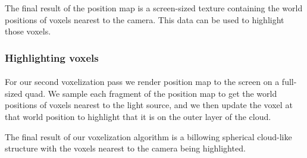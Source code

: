 The final result of the position map is a screen-sized texture containing the world positions of voxels nearest to the camera. This data can be used to highlight those voxels.

\subsubsection{Highlighting voxels}\paragraph{}
For our second voxelization pass we render position map to the screen on a full-sized quad. 
We sample each fragment of the position map to get the world positions of voxels nearest to the light source, and we then update the voxel at that world position to highlight that it is on the outer layer of the cloud. 

The final result of our voxelization algorithm is a billowing spherical cloud-like structure with the voxels nearest to the camera being highlighted. 


